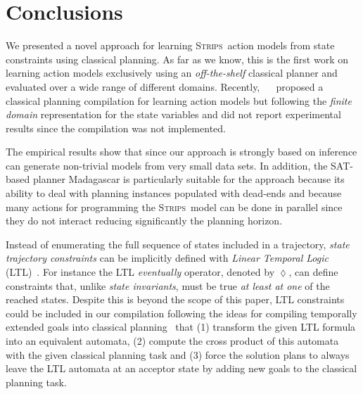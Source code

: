 \documentclass{article}
\newcommand{\strips}{\textsc{Strips}}     %
\begin{document}
\section{Conclusions}
We presented a novel approach for learning \strips\ action models from state constraints using classical planning. As far as we know, this is the first work on learning action models exclusively using an {\em off-the-shelf} classical planner and evaluated over a wide range of different domains. Recently, ~\citeauthor{stern2017efficient}~\citeyear{stern2017efficient} proposed a classical planning compilation for learning action models but following the {\em finite domain} representation for the state variables and did not report experimental results since the compilation was not implemented.

The empirical results show that since our approach is strongly based on inference can generate non-trivial models from very small data sets. In addition, the SAT-based planner {\sc Madagascar} is particularly suitable for the approach because its ability to deal with planning instances populated with dead-ends and because many actions for programming the \strips\ model can be done in parallel since they do not interact reducing significantly the planning horizon.


Instead of enumerating the full sequence of states included in a trajectory, {\em state trajectory constraints} can be implicitly defined with {\em Linear Temporal Logic} (LTL)~\cite{haslum:LTL:ecai10}. For instance the LTL {\em eventually} operator, denoted by $\lozenge$, can define constraints that, unlike {\em state invariants}, must be true {\em at least at one} of the reached states. Despite this is beyond the scope of this paper, LTL constraints could be included in our compilation following the ideas for compiling temporally extended goals into classical planning~\cite{baier2006planning} that (1) transform the given LTL formula into an equivalent automata, (2) compute the cross product of this automata with the given classical planning task and (3) force the solution plans to always leave the LTL automata at an acceptor state by adding new goals to the classical planning task.
\end{document}
